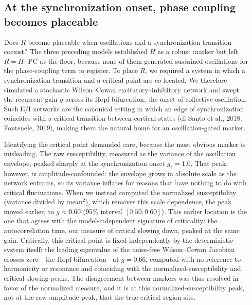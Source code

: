 \documentclass[11pt]{article}
\begin{document}
\subsection{At the synchronization onset, phase coupling becomes placeable}
Does $R$ become placeable when oscillations and a synchronization transition coexist? The three preceding models established $H$ as a robust marker but left $R=H\cdot\mathrm{PC}$ at the floor, because none of them generated sustained oscillations for the phase-coupling term to register. To place $R$, we required a system in which a synchronization transition and a critical point are co-located. We therefore simulated a stochastic Wilson--Cowan excitatory--inhibitory network and swept the recurrent gain $g$ across its Hopf bifurcation, the onset of collective oscillation. Such E/I networks are the canonical setting in which an edge of synchronization coincides with a critical transition between cortical states (di Santo et al., 2018; Fontenele, 2019), making them the natural home for an oscillation-gated marker.

Identifying the critical point demanded care, because the most obvious marker is misleading. The raw susceptibility, measured as the variance of the oscillation envelope, peaked sharply at the synchronization onset $g_c=1.0$. That peak, however, is amplitude-confounded: the envelope grows in absolute scale as the network entrains, so its variance inflates for reasons that have nothing to do with critical fluctuations. When we instead computed the normalized susceptibility (variance divided by mean$^2$), which removes this scale dependence, the peak moved earlier, to $g\approx0.60$ (95\% interval $[0.50,0.60]$). This earlier location is the one that agrees with the model-independent signature of criticality: the autocorrelation time, our measure of critical slowing down, peaked at the same gain. Critically, this critical point is fixed independently by the deterministic system itself: the leading eigenvalue of the noise-free Wilson--Cowan Jacobian crosses zero---the Hopf bifurcation---at $g=0.66$, computed with no reference to harmonicity or resonance and coinciding with the normalized-susceptibility and critical-slowing peaks. The disagreement between markers was thus resolved in favor of the normalized measure, and it is at this normalized-susceptibility peak, not at the raw-amplitude peak, that the true critical region sits.
\end{document}

